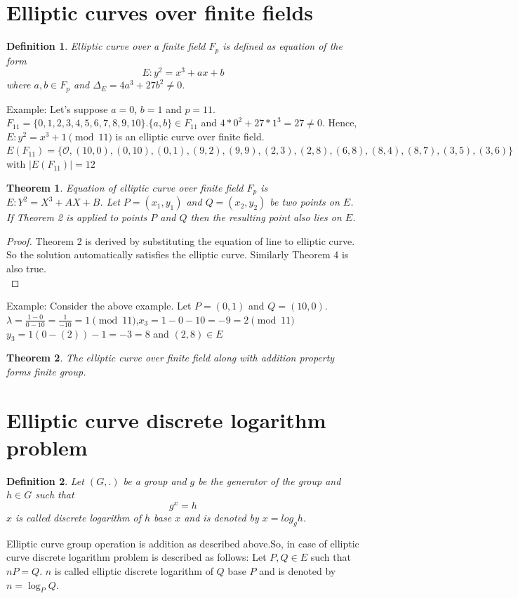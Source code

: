\documentclass[12pt,a4paper]{report}
\newtheorem{theorem}{Theorem}
\newtheorem{definition}{Definition}
\begin{document}
\section{Elliptic curves over finite fields}
\begin{definition}
	Elliptic curve over a finite field $F_p$ is defined as equation of the form $$E:y^2 = x^3+ax+b$$ where $a,b\in F_p$ and $\Delta_E = 4a^3+27b^2\neq 0$.
\end{definition}
Example:
Let's suppose $a=0$, $b=1$ and $p=11$. \\
$F_{11}=\{0,1,2,3,4,5,6,7,8,9,10\}$.$\{a,b\}\in F_{11}$ and $4*0^2+27*1^3=27\neq 0$. Hence, $E:y^2 = x^3+1 \pmod {11} $ is an elliptic curve over finite field. \\
$E(F_{11}) = \{\mathscr{O},(10,0),(0,10),(0,1),(9,2),(9,9),(2,3),(2,8),(6,8),(8,4),(8,7),(3,5),(3,6)\}$
with $|E(F_{11})|=12$
\begin{theorem}
	Equation of elliptic curve over finite field $F_p$ is $E : Y^2=X^3+
		AX+B$. Let $P=(x_1,y_1)$ and $Q=(x_2,y_2)$ be two points on $E$. If Theorem 2 is applied to points $P$ and $Q$ then the resulting point also lies on $E$.
\end{theorem}
\begin{proof}
	Theorem 2 is derived by substituting the equation of line to elliptic curve. So the solution automatically satisfies the elliptic curve. Similarly Theorem 4 is also true.\\
\end{proof}
Example: Consider the above example. Let $P=(0,1)$ and $Q=(10,0)$.
$\lambda = \frac{1-0}{0-10} = \frac{1}{-	10} = 1 \pmod{11}$,$x_3=1-0-10=-9=2 \pmod{11}$\\ $y_3=1(0-(2))-1=-3=8$ and $(2,8) \in E$ \begin{theorem}
	The elliptic curve over finite field along with addition property forms finite group.
\end{theorem}

\cleardoublepage
\section{Elliptic curve discrete logarithm problem}

\begin{definition}
	Let $(G,.)$ be a group and $g$ be the generator of the group and $h\in G$ such that $$g^x=h$$
	$x$ is called discrete logarithm of $h$ base $x$ and is denoted by $x=log_g h$.
\end{definition}
Elliptic curve group operation is addition as described above.So, in case of elliptic curve discrete logarithm problem is described as follows:
Let $P,Q \in E$ such that $nP=Q$. $n$ is called elliptic discrete logarithm of $Q$ base $P$ and is denoted by $n =\log_P Q$.
\end{document}
